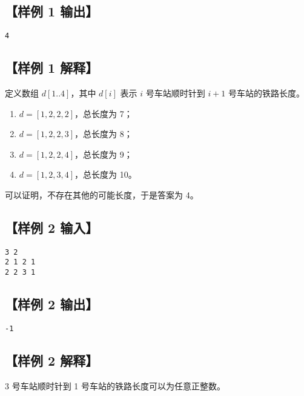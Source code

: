 \documentclass[11pt,a4paper,oneside]{article}
\begin{document}
\subsection*{【样例 1 输出】}

\begin{verbatim}
4
\end{verbatim}

\subsection*{【样例 1 解释】}

定义数组 $d[1..4]$，其中 $d[i]$ 表示 $i$ 号车站顺时针到 $i+1$ 号车站的铁路长度。

\begin{enumerate}
  \item $d=[1,2,2,2]$，总长度为 7；
  \item $d=[1,2,2,3]$，总长度为 8；
  \item $d=[1,2,2,4]$，总长度为 9；
  \item $d=[1,2,3,4]$，总长度为 10。
\end{enumerate}

可以证明，不存在其他的可能长度，于是答案为 4。

\subsection*{【样例 2 输入】}

\begin{verbatim}
3 2
2 1 2 1
2 2 3 1
\end{verbatim}

\subsection*{【样例 2 输出】}

\begin{verbatim}
-1
\end{verbatim}

\subsection*{【样例 2 解释】}

3 号车站顺时针到 1 号车站的铁路长度可以为任意正整数。
\end{document}
